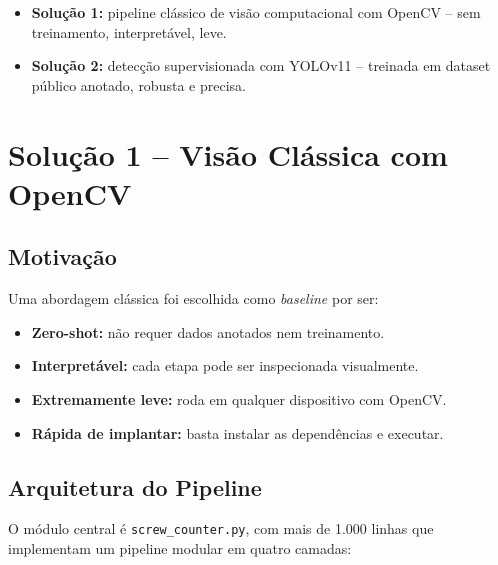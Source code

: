 \documentclass[12pt,a4paper]{article}
\begin{document}
\begin{itemize}[leftmargin=*]
  \item \textbf{Solu\c{c}\~ao 1:} pipeline cl\'assico de vis\~ao computacional com OpenCV --
        sem treinamento, interpret\'avel, leve.
  \item \textbf{Solu\c{c}\~ao 2:} detec\c{c}\~ao supervisionada com YOLOv11 -- treinada
        em dataset p\'ublico anotado, robusta e precisa.
\end{itemize}

\section{Solu\c{c}\~ao 1 -- Vis\~ao Cl\'assica com OpenCV}
\label{sec:sol1}

\subsection{Motiva\c{c}\~ao}

Uma abordagem cl\'assica foi escolhida como \emph{baseline} por ser:
\begin{itemize}[leftmargin=*]
  \item \textbf{Zero-shot:} n\~ao requer dados anotados nem treinamento.
  \item \textbf{Interpret\'avel:} cada etapa pode ser inspecionada visualmente.
  \item \textbf{Extremamente leve:} roda em qualquer dispositivo com OpenCV.
  \item \textbf{R\'apida de implantar:} basta instalar as depend\^encias e executar.
\end{itemize}

\subsection{Arquitetura do Pipeline}

O m\'odulo central \'e \texttt{screw\_counter.py}, com mais de 1.000 linhas que implementam
um pipeline modular em quatro camadas:

\begin{center}
\end{center}
\end{document}
